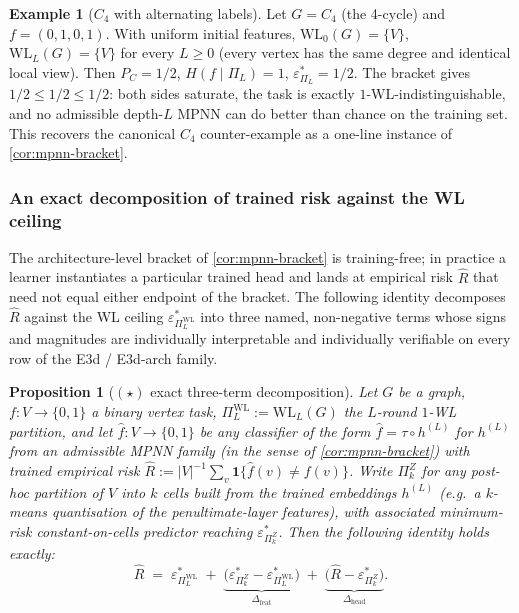 \documentclass[10pt]{article}
\newtheorem{proposition}[theorem]{Proposition}
\theoremstyle{definition}
\newtheorem{example}[theorem]{Example}
\theoremstyle{remark}
\newcommand{\eps}{\varepsilon}
\begin{document}
\begin{example}[$C_{4}$ with alternating labels]\label{ex:mpnn}
Let $G = C_{4}$ (the 4-cycle) and $f = (0, 1, 0, 1)$. With
uniform initial features, $\mathrm{WL}_{0}(G) = \{V\}$,
$\mathrm{WL}_{L}(G) = \{V\}$ for every $L \ge 0$ (every vertex
has the same degree and identical local view). Then
$P_{C} = 1/2$, $H(f \mid \Pi_{L}) = 1$,
$\eps^{\!*}_{\Pi_{L}} = 1/2$. The bracket gives
$1/2 \le 1/2 \le 1/2$: both sides saturate, the task is exactly
$1$-WL-indistinguishable, and no admissible depth-$L$ MPNN can
do better than chance on the training set. This recovers the
canonical $C_{4}$ counter-example
\citep{xu2019gin,morris2019wl} as a one-line instance of
\cref{cor:mpnn-bracket}.
\end{example}

\subsubsection{An exact decomposition of trained risk against the
WL ceiling}\label{sec:apps:star-decomp}

The architecture-level bracket of \cref{cor:mpnn-bracket} is
training-free; in practice a learner instantiates a particular
trained head and lands at empirical risk $\hat R$ that need not
equal either endpoint of the bracket. The following identity
decomposes $\hat R$ against the WL ceiling
$\eps^{*}_{\Pi^{\mathrm{WL}}_{L}}$ into three named, non-negative
terms whose signs and magnitudes are individually interpretable
and individually verifiable on every row of the E3d / E3d-arch
family.

\begin{proposition}[$(\star)$ exact three-term decomposition]\label{prop:star-decomp}
Let $G$ be a graph, $f : V \to \{0, 1\}$ a binary vertex task,
$\Pi^{\mathrm{WL}}_{L} := \mathrm{WL}_{L}(G)$ the $L$-round
$1$-WL partition, and let $\widehat f : V \to \{0, 1\}$ be any
classifier of the form
$\widehat f = \tau \circ h^{(L)}$ for $h^{(L)}$ from an admissible
MPNN family (in the sense of \cref{cor:mpnn-bracket}) with
trained empirical risk $\hat R := |V|^{-1}\sum_{v} \mathbf 1\{\widehat f(v) \ne f(v)\}$.
Write $\Pi^{Z}_{k}$ for any \emph{post-hoc} partition of $V$ into
$k$ cells built from the trained embeddings $h^{(L)}$
(e.g.\ a $k$-means quantisation of the penultimate-layer
features), with associated minimum-risk constant-on-cells
predictor reaching $\eps^{*}_{\Pi^{Z}_{k}}$. Then the
following identity holds exactly:
\begin{equation}\label{eq:star-decomp}
  \hat R \;=\; \eps^{*}_{\Pi^{\mathrm{WL}}_{L}}
   \;+\; \underbrace{\bigl(\eps^{*}_{\Pi^{Z}_{k}}
                          - \eps^{*}_{\Pi^{\mathrm{WL}}_{L}}\bigr)}_{
       \displaystyle \Delta_{\mathrm{feat}}}
   \;+\; \underbrace{\bigl(\hat R - \eps^{*}_{\Pi^{Z}_{k}}\bigr)}_{
       \displaystyle \Delta_{\mathrm{head}}}.
       \tag{$\star$}
\end{equation}
\end{proposition}
\end{document}
